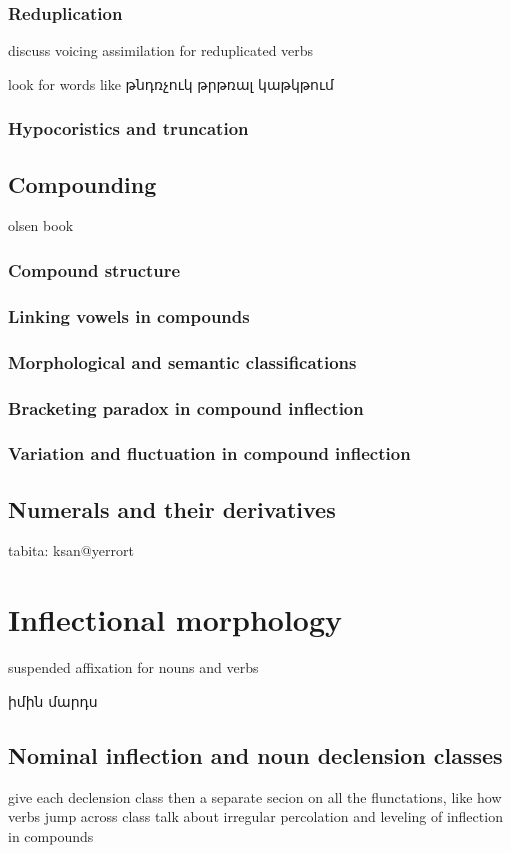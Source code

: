\section{Reduplication}
discuss voicing assimilation for reduplicated verbs

look for words like թնդռչուկ
 թրթռալ
 կաթկթում
\section{Hypocoristics and truncation}


\chapter{Compounding}
olsen book
\section{Compound structure}
\section{Linking vowels in compounds}
\section{Morphological and semantic classifications}
\section{Bracketing paradox in compound inflection}
\section{Variation and fluctuation in compound inflection}
\chapter{Numerals and their derivatives}
tabita: ksan@yerrort
\part{Inflectional morphology}
suspended affixation for nouns and verbs

իմին մարդս 
\chapter{Nominal inflection and noun declension classes}
give each declension class
then a separate secion on all the flunctations, like how verbs jump across class
talk about irregular percolation and leveling of inflection in compounds
